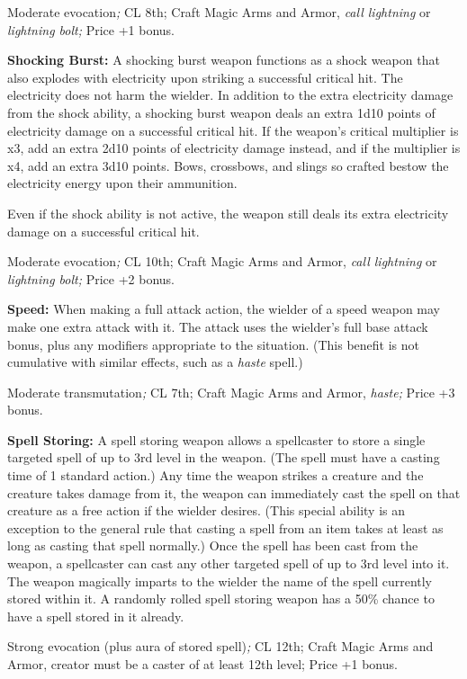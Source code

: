 Moderate evocation\textit{; }CL 8th; Craft Magic Arms and Armor, \textit{call lightning 
}or \textit{lightning bolt; }Price +1 bonus.

\textbf{Shocking Burst:} A shocking burst weapon functions as a shock weapon that 
also explodes with electricity upon striking a successful critical hit. The electricity 
does not harm the wielder. In addition to the extra electricity damage from the 
shock ability, a shocking burst weapon deals an extra 1d10 points of electricity 
damage on a successful critical hit. If the weapon's critical multiplier is x3, 
add an extra 2d10 points of electricity damage instead, and if the multiplier is 
x4, add an extra 3d10 points. Bows, crossbows, and slings so crafted bestow the 
electricity energy upon their ammunition.

Even if the shock ability is not active, the weapon still deals its extra electricity 
damage on a successful critical hit.

Moderate evocation\textit{; }CL 10th; Craft Magic Arms and Armor, \textit{call 
lightning }or \textit{lightning bolt; }Price +2 bonus.

\textbf{Speed: }When making a full attack action, the wielder of a speed weapon 
may make one extra attack with it. The attack uses the wielder's full base attack 
bonus, plus any modifiers appropriate to the situation. (This benefit is not cumulative 
with similar effects, such as a \textit{haste }spell.)

Moderate transmutation\textit{; }CL 7th; Craft Magic Arms and Armor, \textit{haste; 
}Price +3 bonus.

\textbf{Spell Storing:} A spell storing weapon allows a spellcaster to store a 
single targeted spell of up to 3rd level in the weapon. (The spell must have a 
casting time of 1 standard action.) Any time the weapon strikes a creature and 
the creature takes damage from it, the weapon can immediately cast the spell on 
that creature as a free action if the wielder desires. (This special ability is 
an exception to the general rule that casting a spell from an item takes at least 
as long as casting that spell normally.) Once the spell has been cast from the 
weapon, a spellcaster can cast any other targeted spell of up to 3rd level into 
it. The weapon magically imparts to the wielder the name of the spell currently 
stored within it. A randomly rolled spell storing weapon has a 50\% chance to have 
a spell stored in it already.

Strong evocation (plus aura of stored spell)\textit{; }CL 12th; Craft Magic Arms 
and Armor, creator must be a caster of at least 12th level; Price +1 bonus.

